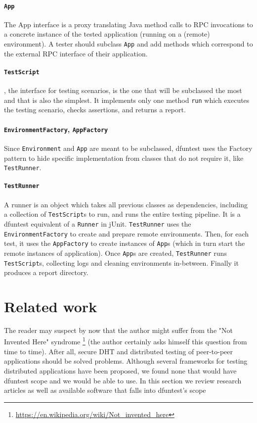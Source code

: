 \paragraph{\texttt{App}}
The App interface is a proxy translating Java method calls to RPC invocations to a concrete instance of the tested application (running on a (remote) environment).
A tester should subclass \texttt{App} and add methods which correspond to the external RPC interface of their application.

\paragraph{\texttt{TestScript}}, the interface for testing scenarios, is the one
that will be subclassed the most and that is also the simplest. It implements
only one method \texttt{run} which executes the testing scenario, checks
assertions, and returns a report.

\paragraph{\texttt{EnvironmentFactory}, \texttt{AppFactory}} Since
\texttt{Environment} and \texttt{App} are meant to be subclassed, dfuntest uses
the Factory pattern to hide specific implementation from classes that do not require
it, like \texttt{TestRunner}.

\paragraph{\texttt{TestRunner}} A runner is an object which takes all previous
classes as dependencies, including a collection of \texttt{TestScript}s to run,
and runs the entire testing pipeline. It is a dfuntest equivalent of a
\texttt{Runner} in jUnit.
\texttt{TestRunner} uses the \texttt{EnvironmentFactory} to
create and prepare remote environments. Then, for each test, it uses the
\texttt{AppFactory} to create instances of \texttt{App}s (which in turn start
the remote instances of application). Once \texttt{App}s are created,
\texttt{TestRunner} runs \texttt{TestScript}s, collecting logs and cleaning
environments in-between. Finally it produces a report directory.

\section{Related work}
The reader may suspect by now that the author might suffer from the "Not Invented Here" syndrome \footnote{\url{https://en.wikipedia.org/wiki/Not\_invented\_here}} (the author certainly asks himself this question from time to time).
After all, secure DHT and distributed testing of peer-to-peer applications should be solved problems.
Although several frameworks for testing distributed applications have been proposed, we found none that would have dfuntest scope and we would be able to use.
In this section we review research articles as well as available software that falls into dfuntest's scope


